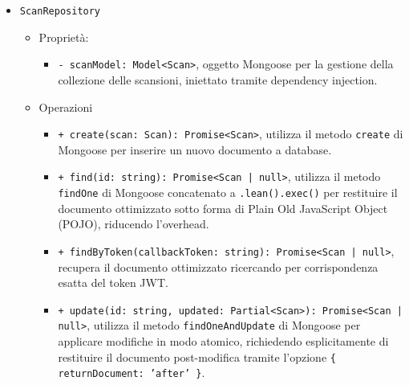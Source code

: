 \documentclass[a4paper, 11pt]{article}
\newcounter{subsubsubsection}[subsubsection]
\begin{document}
\begin{itemize}
\begin{itemize}
      \item \texttt{ScanRepository}
        \begin{itemize}
          \item Proprietà:
            \begin{itemize}
              \item \texttt{- scanModel: Model<Scan>}, oggetto Mongoose per la gestione della collezione delle scansioni, iniettato tramite dependency injection.
            \end{itemize}
          \item Operazioni
            \begin{itemize}
              \item \texttt{+ create(scan: Scan): Promise<Scan>}, utilizza il metodo \texttt{create} di Mongoose per inserire un nuovo documento a database.
              \item \texttt{+ find(id: string): Promise<Scan | null>}, utilizza il metodo \texttt{findOne} di Mongoose concatenato a \texttt{.lean().exec()} per restituire il documento ottimizzato sotto forma di Plain Old JavaScript Object (POJO), riducendo l'overhead.
              \item \texttt{+ findByToken(callbackToken: string): Promise<Scan | null>}, recupera il documento ottimizzato ricercando per corrispondenza esatta del token JWT.
              \item \texttt{+ update(id: string, updated: Partial<Scan>): Promise<Scan | null>}, utilizza il metodo \texttt{findOneAndUpdate} di Mongoose per applicare modifiche in modo atomico, richiedendo esplicitamente di restituire il documento post-modifica tramite l'opzione \texttt{\{ returnDocument: 'after' \}}.
            \end{itemize}
        \end{itemize}
    \end{itemize}
\end{itemize}


\newpage
{}
\end{document}
